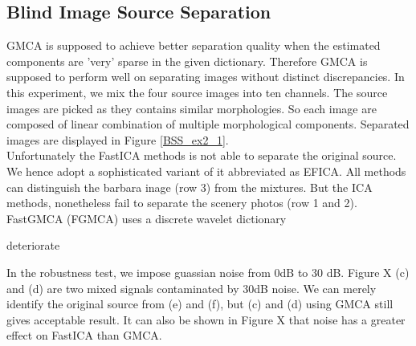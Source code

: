 \subsection{Blind Image Source Separation}
GMCA is supposed to achieve better separation quality when the estimated components are 'very' sparse in the given dictionary. Therefore GMCA is supposed to perform well on separating images without distinct discrepancies. In this experiment, we mix the four source images into ten channels. The source images are picked as they contains similar morphologies. So each image are composed of linear combination of multiple morphological components. Separated images are displayed in Figure \ref{BSS_ex2_1}.\\

Unfortunately the FastICA methods is not able to separate the original source. We hence adopt a sophisticated variant of it abbreviated as EFICA. All methods can distinguish the barbara inage (row 3) from the mixtures. But the ICA methods, nonetheless fail to separate the scenery photos (row 1 and 2). FastGMCA (FGMCA) uses a discrete wavelet dictionary

deteriorate


In the robustness test, we impose guassian noise from 0dB to 30 dB. Figure X (c) and (d) are two mixed signals contaminated by 30dB noise. We can merely identify the original source from (e) and (f), but (c) and (d) using GMCA still gives acceptable result. It can also be shown in Figure X that noise has a greater effect on FastICA than GMCA. \\








